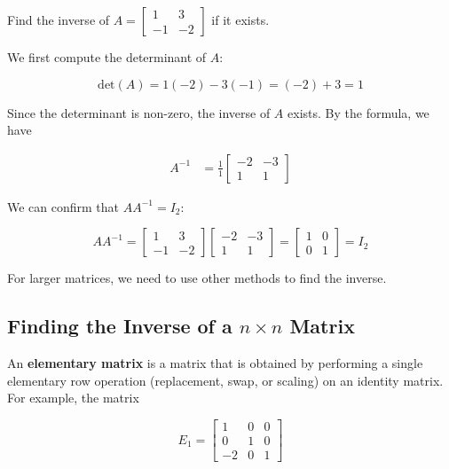 \begin{example} Find the inverse of $A=\left[\begin{array}{cc}1 & 3 \\ -1 & -2\end{array}\right]$ if it exists.
    
\end{example}

\begin{solution}
    We first compute the determinant of $A$:

    \[
    \text{det}(A)=1(-2)-3(-1)=(-2)+3=1
    \]

    Since the determinant is non-zero, the inverse of $A$ exists. By the formula, we have

    \[
    \begin{aligned}
    A^{-1} & =\frac{1}{1}\left[\begin{array}{cc}-2 & -3 \\ 1 & 1\end{array}\right]
    \end{aligned}
    \]

    We can confirm that $A A^{-1}=I_2$:

    \[
        A A^{-1}=\left[\begin{array}{cc}
    1 & 3 \\
    -1 & -2
    \end{array}\right]\left[\begin{array}{cc}
    -2 & -3 \\
    1 & 1
    \end{array}\right]=\left[\begin{array}{ll}
    1 & 0 \\
    0 & 1
    \end{array}\right] =I_2
    \]

\end{solution}

For larger matrices, we need to use other methods to find the inverse.

\subsection*{Finding the Inverse of a $n \times n$ Matrix}
An \textbf{elementary matrix} is a matrix that is obtained by performing a single elementary row operation (replacement, swap, or scaling) on an identity matrix. For example, the matrix

\[
E_1=\left[\begin{array}{ccc}
1 & 0 & 0 \\
0 & 1 & 0 \\
-2 & 0 & 1
\end{array}\right]
\]


